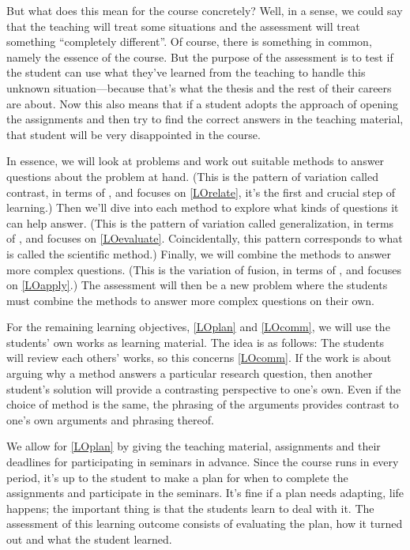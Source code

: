 But what does this mean for the course concretely?
Well, in a sense, we could say that the teaching will treat some situations and 
the assessment will treat something \enquote{completely different}.
Of course, there is something in common, namely the essence of the course.
But the purpose of the assessment is to test if the student can use what 
they've learned from the teaching to handle this unknown situation---because 
that's what the thesis and the rest of their careers are about.
Now this also means that if a student adopts the approach of opening the 
assignments and then try to find the correct answers in the teaching material, 
that student will be very disappointed in the course.

In essence, we will look at problems and work out suitable methods to answer 
questions about the problem at hand.
(This is the pattern of variation called contrast, in terms of 
\cite{NecessaryConditionsOfLearning}, and focuses on \ref{LOrelate}, it's the 
first and crucial step of learning.)
Then we'll dive into each method to explore what kinds of questions it can help 
answer.
(This is the pattern of variation called generalization, in terms of 
\cite{NecessaryConditionsOfLearning}, and focuses on \ref{LOevaluate}.
Coincidentally, this pattern corresponds to what is called the scientific 
method.)
Finally, we will combine the methods to answer more complex questions.
(This is the variation of fusion, in terms of 
\cite{NecessaryConditionsOfLearning}, and focuses on \ref{LOapply}.)
The assessment will then be a new problem where the students must combine the 
methods to answer more complex questions on their own.

For the remaining learning objectives, \ref{LOplan} and \ref{LOcomm}, we will 
use the students' own works as learning material.
The idea is as follows:
The students will review each others' works, so this concerns \ref{LOcomm}.
If the work is about arguing why a method answers a particular research 
question, then another student's solution will provide a contrasting 
perspective to one's own.
Even if the choice of method is the same, the phrasing of the arguments 
provides contrast to one's own arguments and phrasing thereof.

We allow for \ref{LOplan} by giving the teaching material, assignments and 
their deadlines for participating in seminars in advance.
Since the course runs in every period, it's up to the student to make a plan 
for when to complete the assignments and participate in the seminars.
It's fine if a plan needs adapting, life happens; the important thing is that 
the students learn to deal with it.
The assessment of this learning outcome consists of evaluating the plan, how it 
turned out and what the student learned.

